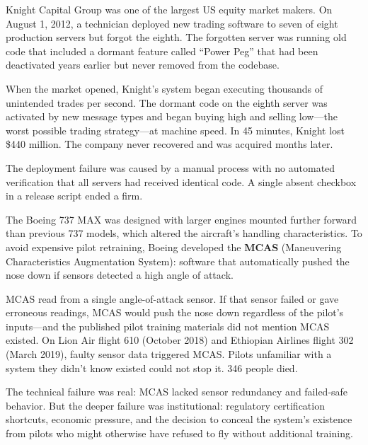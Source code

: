 \documentclass[11pt,letterpaper]{article}
\begin{document}
\begin{historybox}
Knight Capital Group was one of the largest US equity market makers. On August 1, 2012, a technician deployed new trading software to seven of eight production servers but forgot the eighth. The forgotten server was running old code that included a dormant feature called ``Power Peg'' that had been deactivated years earlier but never removed from the codebase.

When the market opened, Knight's system began executing thousands of unintended trades per second. The dormant code on the eighth server was activated by new message types and began buying high and selling low---the worst possible trading strategy---at machine speed. In 45 minutes, Knight lost \$440 million. The company never recovered and was acquired months later.

The deployment failure was caused by a manual process with no automated verification that all servers had received identical code. A single absent checkbox in a release script ended a firm.
\end{historybox}

\begin{historybox}
The Boeing 737 MAX was designed with larger engines mounted further forward than previous 737 models, which altered the aircraft's handling characteristics. To avoid expensive pilot retraining, Boeing developed the \textbf{MCAS} (Maneuvering Characteristics Augmentation System): software that automatically pushed the nose down if sensors detected a high angle of attack.

MCAS read from a single angle-of-attack sensor. If that sensor failed or gave erroneous readings, MCAS would push the nose down regardless of the pilot's inputs---and the published pilot training materials did not mention MCAS existed. On Lion Air flight 610 (October 2018) and Ethiopian Airlines flight 302 (March 2019), faulty sensor data triggered MCAS. Pilots unfamiliar with a system they didn't know existed could not stop it. 346 people died.

The technical failure was real: MCAS lacked sensor redundancy and failed-safe behavior. But the deeper failure was institutional: regulatory certification shortcuts, economic pressure, and the decision to conceal the system's existence from pilots who might otherwise have refused to fly without additional training.
\end{historybox}
\end{document}
